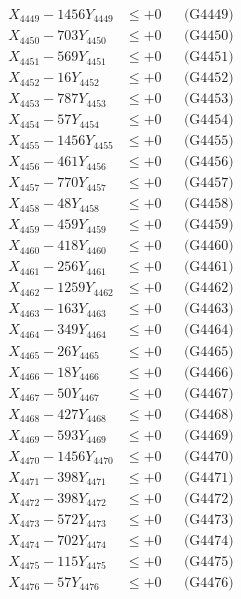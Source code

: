 \documentclass[a4paper,10pt]{article}
\begin{document}
{\begin{align}
X_{4449} - 1456Y_{4449} &\leq +0 && \text{(G4449)} \\
X_{4450} - 703Y_{4450} &\leq +0 && \text{(G4450)} \\
\allowbreak
X_{4451} - 569Y_{4451} &\leq +0 && \text{(G4451)} \\
X_{4452} - 16Y_{4452} &\leq +0 && \text{(G4452)} \\
X_{4453} - 787Y_{4453} &\leq +0 && \text{(G4453)} \\
X_{4454} - 57Y_{4454} &\leq +0 && \text{(G4454)} \\
X_{4455} - 1456Y_{4455} &\leq +0 && \text{(G4455)} \\
X_{4456} - 461Y_{4456} &\leq +0 && \text{(G4456)} \\
X_{4457} - 770Y_{4457} &\leq +0 && \text{(G4457)} \\
X_{4458} - 48Y_{4458} &\leq +0 && \text{(G4458)} \\
X_{4459} - 459Y_{4459} &\leq +0 && \text{(G4459)} \\
X_{4460} - 418Y_{4460} &\leq +0 && \text{(G4460)} \\
\allowbreak
X_{4461} - 256Y_{4461} &\leq +0 && \text{(G4461)} \\
X_{4462} - 1259Y_{4462} &\leq +0 && \text{(G4462)} \\
X_{4463} - 163Y_{4463} &\leq +0 && \text{(G4463)} \\
X_{4464} - 349Y_{4464} &\leq +0 && \text{(G4464)} \\
X_{4465} - 26Y_{4465} &\leq +0 && \text{(G4465)} \\
X_{4466} - 18Y_{4466} &\leq +0 && \text{(G4466)} \\
X_{4467} - 50Y_{4467} &\leq +0 && \text{(G4467)} \\
X_{4468} - 427Y_{4468} &\leq +0 && \text{(G4468)} \\
X_{4469} - 593Y_{4469} &\leq +0 && \text{(G4469)} \\
X_{4470} - 1456Y_{4470} &\leq +0 && \text{(G4470)} \\
\allowbreak
X_{4471} - 398Y_{4471} &\leq +0 && \text{(G4471)} \\
X_{4472} - 398Y_{4472} &\leq +0 && \text{(G4472)} \\
X_{4473} - 572Y_{4473} &\leq +0 && \text{(G4473)} \\
X_{4474} - 702Y_{4474} &\leq +0 && \text{(G4474)} \\
X_{4475} - 115Y_{4475} &\leq +0 && \text{(G4475)} \\
X_{4476} - 57Y_{4476} &\leq +0 && \text{(G4476)} \\

\end{align}}
\end{document}
